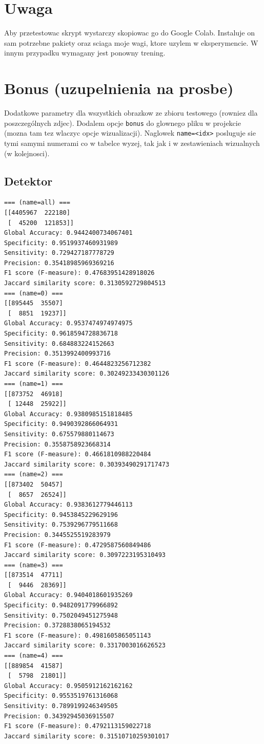 \documentclass{bmvc2k}
\begin{document}
\section{Uwaga}

Aby przetestowac skrypt wystarczy skopiowac go do Google Colab. Instaluje on sam
potrzebne pakiety oraz sciaga moje wagi, ktore uzylem w
eksperymencie. W innym przypadku wymagany jest ponowny trening.

\section{Bonus (uzupelnienia na prosbe)}

Dodatkowe parametry dla wszystkich obrazkow ze zbioru testowego (rowniez dla
poszczególnych zdjec). Dodalem opcje {\tt \-\-bonus} do glownego pliku w
projekcie (mozna tam tez wlaczyc opcje wizualizacji).
Naglowek {\tt name=<idx>} posluguje sie tymi samymi numerami co w tabelce wyzej,
tak jak i w zestawieniach wizualnych (w kolejnosci).

\subsection{Detektor}
\begin{verbatim}
=== (name=all) ===
[[4405967  222180]
 [  45200  121853]]
Global Accuracy: 0.9442400734067401
Specificity: 0.9519937460931989
Sensitivity: 0.729427187778729
Precision: 0.35418985969369216
F1 score (F-measure): 0.47683951428918026
Jaccard similarity score: 0.3130592729804513
=== (name=0) ===
[[895445  35507]
 [  8851  19237]]
Global Accuracy: 0.9537474974974975
Specificity: 0.9618594728836718
Sensitivity: 0.684883224152663
Precision: 0.3513992400993716
F1 score (F-measure): 0.4644823256712382
Jaccard similarity score: 0.30249233430301126
=== (name=1) ===
[[873752  46918]
 [ 12448  25922]]
Global Accuracy: 0.9380985151818485
Specificity: 0.9490392866064931
Sensitivity: 0.675579880114673
Precision: 0.3558758923668314
F1 score (F-measure): 0.4661810988220484
Jaccard similarity score: 0.30393490291717473
=== (name=2) ===
[[873402  50457]
 [  8657  26524]]
Global Accuracy: 0.9383612779446113
Specificity: 0.9453845229629196
Sensitivity: 0.7539296779511668
Precision: 0.3445525519283979
F1 score (F-measure): 0.4729587560849486
Jaccard similarity score: 0.3097223195310493
=== (name=3) ===
[[873514  47711]
 [  9446  28369]]
Global Accuracy: 0.9404018601935269
Specificity: 0.9482091779966892
Sensitivity: 0.7502049451275948
Precision: 0.3728838065194532
F1 score (F-measure): 0.4981605865051143
Jaccard similarity score: 0.3317003016626523
=== (name=4) ===
[[889854  41587]
 [  5798  21801]]
Global Accuracy: 0.9505912162162162
Specificity: 0.9553519761316068
Sensitivity: 0.7899199246349505
Precision: 0.34392945036915507
F1 score (F-measure): 0.4792113159022718
Jaccard similarity score: 0.31510710259301017
\end{verbatim}
\end{document}
